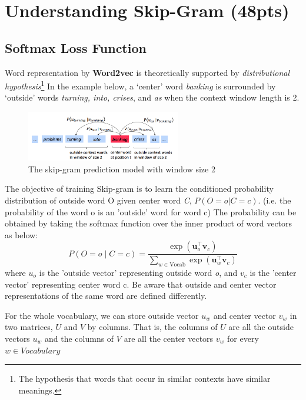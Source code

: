 \documentclass{assignment format}
\begin{document}
\section{Understanding Skip-Gram (48pts)}

\subsection{Softmax Loss Function}
Word representation by \textbf{Word2vec} is theoretically supported by  \textit{distributional hypothesis}\footnote{The hypothesis that words that occur in similar contexts have similar meanings.} In the example below, a `center' word \textit{banking} is surrounded by `outside' words \textit{turning, into, crises}, and \textit{as} when the context window length is 2.

\begin{figure}[h]
    \centering
    \includegraphics[width=0.6\textwidth]{word2vec.png}
    \caption{The skip-gram prediction model with window size 2}
    \label{fig:word2vec}
\end{figure}
The objective of training Skip-gram is to learn the conditioned probability distribution of outside word {O} given center word \textit{C}, $P(O=o|C=c)$. (i.e. the probability of the word o is an 'outside' word for word c)
The probability can be obtained by taking the softmax function over the inner product of word vectors as below:
\begin{equation}
 P(O=o \mid C=c) = \frac{\exp(\bm u_{o}^\top \bm v_c)}{\sum_{w \in \text{Vocab}} \exp(\bm u_{w}^\top \bm v_c)}
 \label{word2vec_condprob}
\end{equation}
where $u_o$ is the 'outside vector' representing outside word \textit{o}, and $v_c$ is the 'center vector' representing center word c. Be aware that outside and center vector representations of the same word are defined differently.

For the whole vocabulary, we can store outside vector $u_w$ and center vector $v_w$ in two matrices, $U$ and $V$ by columns. That is, the columns of $U$ are all the outside vectors $u_w$ and the columns of $V$ are all the center vectors $v_w$ for every $w \in Vocabulary$


\end{document}
